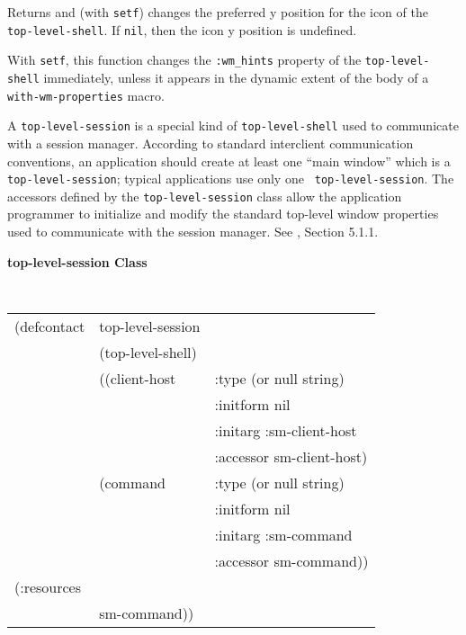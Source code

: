 \documentclass[twoside]{book}
\begin{document}
\begin{sloppy}
{\begin{flushright}
{}\end{flushright}}

\begin{flushright} \parbox[t]{6.125in}{
Returns and (with {\tt setf}) changes the preferred y position for the icon of the {\tt
top-level-shell}. If {\tt nil}, then the icon y position is
undefined.

With {\tt setf}, this function changes the {\tt :wm\_hints} property of
the {\tt top-level-shell} immediately, unless it appears in the dynamic extent of the
body of a {\tt with-wm-properties} macro.


}\end{flushright}


A {\tt top-level-session} is a special kind of {\tt top-level-shell} used
to communicate with a session manager. 
According
to standard interclient communication conventions\cite{icccm}, an
application should create at least one ``main window'' which is a
{\tt top-level-session}; typical applications use only one {\tt
top-level-session}.
The accessors defined by the {\tt top-level-session} class allow
the application programmer to initialize and modify the standard
top-level window properties used to communicate with the session
manager. See \cite{icccm}, Section 5.1.1.

{\samepage 
{\large {\bf top-level-session \hfill Class}} 
\begin{flushright} \parbox[t]{6.125in}{
\tt
\begin{tabular}{lll}
\raggedright
(defcontact & top-level-session \\
& (top-level-shell) \\
&  ((client-host       & :type     (or null string) \\
&		       & :initform nil  \\
&		       & :initarg  :sm-client-host \\
&		       & :accessor sm-client-host) \\
&   (command           & :type     (or null string) \\
&		       & :initform nil  \\
&		       & :initarg  :sm-command \\
&		       & :accessor sm-command))\\
(:resources\\
&     sm-command))\\
\end{tabular}
\rm

}
\end{flushright}}
\end{sloppy}
\end{document}
